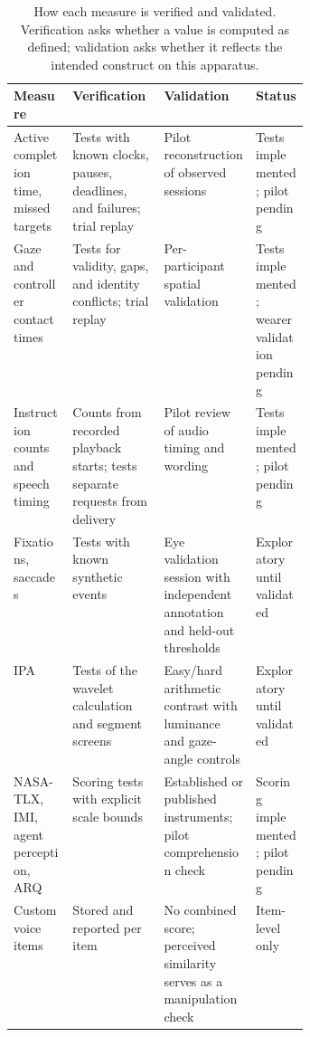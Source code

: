 \begin{table}[htbp]
\centering
\caption[How each measure is verified and validated]{How each measure is verified and validated. Verification asks whether a value is computed as defined; validation asks whether it reflects the intended construct on this apparatus.}
\label{tab:measure-validation}
\small
{}
\begin{tabularx}{\linewidth}{@{}>{\raggedright\arraybackslash}p{0.2\linewidth}>{\raggedright\arraybackslash}X>{\raggedright\arraybackslash}X>{\raggedright\arraybackslash}p{0.18\linewidth}@{}}
\toprule
Measure & Verification & Validation & Status \\\midrule
Active completion time, missed targets & Tests with known clocks, pauses, deadlines, and failures; trial replay & Pilot reconstruction of observed sessions & Tests implemented; pilot pending \\
Gaze and controller contact times & Tests for validity, gaps, and identity conflicts; trial replay & Per-participant spatial validation & Tests implemented; wearer validation pending \\
Instruction counts and speech timing & Counts from recorded playback starts; tests separate requests from delivery & Pilot review of audio timing and wording & Tests implemented; pilot pending \\
Fixations, saccades & Tests with known synthetic events & Eye validation session with independent annotation and held-out thresholds & Exploratory until validated \\
IPA & Tests of the wavelet calculation and segment screens & Easy/hard arithmetic contrast with luminance and gaze-angle controls & Exploratory until validated \\
NASA-TLX, IMI, agent perception, ARQ & Scoring tests with explicit scale bounds & Established or published instruments; pilot comprehension check & Scoring implemented; pilot pending \\
Custom voice items & Stored and reported per item & No combined score; perceived similarity serves as a manipulation check & Item-level only \\\bottomrule
\end{tabularx}
\end{table}

